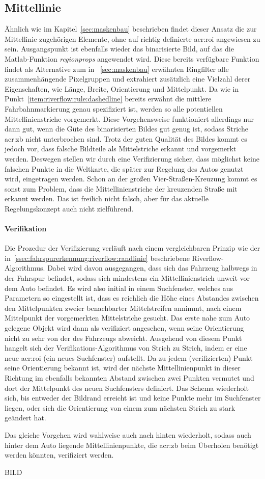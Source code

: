 \subsection{Mittellinie}

Ähnlich wie im Kapitel~\ref{sec:maskenbau} beschrieben findet dieser Ansatz die zur Mittellinie zugehörigen Elemente, ohne auf richtig definierte \gls{acr:roi} angewiesen zu sein. Ausgangspunkt ist ebenfalls wieder das binarisierte Bild, auf das die Matlab-Funktion \emph{regionprops} angewendet wird. Diese bereits verfügbare Funktion findet als Alternative zum in ~\ref{sec:maskenbau} erwähnten \glqq Ringfilter\grqq{} alle zusammenhängende Pixelgruppen und extrahiert zusätzlich eine Vielzahl derer Eigenschaften, wie Länge, Breite, Orientierung und Mittelpunkt. Da wie in Punkt~\ref{item:riverflow:rule:dashedline} bereits erwähnt die mittlere Fahrbahnmarkierung genau spezifiziert ist, werden so alle potentiellen Mittellinienstriche vorgemerkt. Diese Vorgehensweise funktioniert allerdings nur dann gut, wenn die Güte des binarisierten Bildes gut genug ist, sodass Striche \gls{acr:zb} nicht unterbrochen sind. Trotz der guten Qualität des Bildes kommt es jedoch vor, dass falsche Bildteile als Mittelstriche erkannt und vorgemerkt werden. Deswegen stellen wir durch eine Verifizierung sicher, dass möglichst keine falschen Punkte in die Weltkarte, die später zur Regelung des Autos genutzt wird, eingetragen werden. Schon an der großen Vier-Straßen-Kreuzung kommt es sonst zum Problem, dass die Mittellinienstriche der kreuzenden Straße mit erkannt werden. Das ist freilich nicht falsch, aber für das aktuelle Regelungskonzept auch nicht zielführend. 

\paragraph{Verifikation}

Die Prozedur der Verifizierung verläuft nach einem vergleichbaren Prinzip wie der in~\ref{ssec:fahrspurerkennung:riverflow:randlinie} beschriebene Riverflow-Algorithmus. Dabei wird davon ausgegangen, dass sich das Fahrzeug halbwegs in der Fahrspur befindet, sodass sich mindestens ein Mittellinienstrich unweit vor dem Auto befindet. Es wird also initial in einem  Suchfenster, welches aus Parametern so eingestellt ist, dass es reichlich die Höhe eines Abstandes zwischen den Mittelpunkten zweier benachbarter Mittelstreifen annimmt, nach einem Mittelpunkt der vorgemerkten Mittelstriche gesucht. Das erste nahe zum Auto gelegene Objekt wird dann als verifiziert angesehen, wenn seine Orientierung nicht zu sehr von der des Fahrzeugs abweicht. Ausgehend von diesem Punkt \glqq hangelt\grqq{} sich der Verifikations-Algorithmus von Strich zu Strich, indem er eine neue \gls{acr:roi} (ein neues Suchfenster) aufstellt. Da zu jedem (verifizierten) Punkt seine Orientierung bekannt ist, wird der nächste Mittellinienpunkt in dieser Richtung im ebenfalls bekannten Abstand zwischen zwei Punkten vermutet und dort der Mittelpunkt des neuen Suchfensters definiert. Das Schema wiederholt sich, bis entweder der Bildrand erreicht ist und keine Punkte mehr im Suchfenster liegen, oder sich die Orientierung von einem zum nächsten Strich zu stark geändert hat.

Das gleiche Vorgehen wird wahlweise auch nach hinten wiederholt, sodass auch hinter dem Auto liegende Mittellinienpunkte, die \gls{acr:zb} beim Überholen benötigt werden könnten, verifiziert werden.

BILD